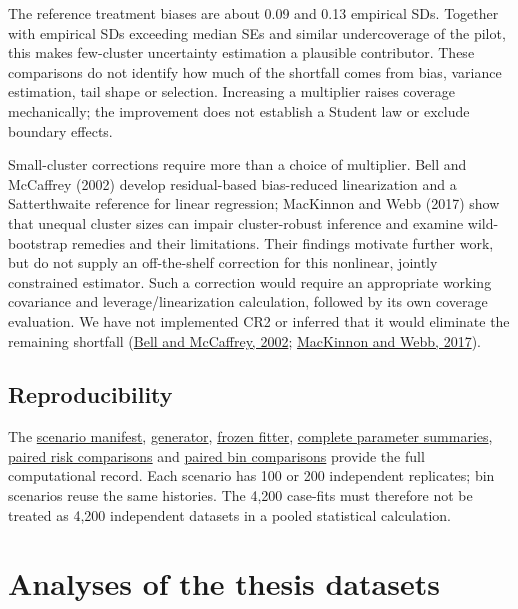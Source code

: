\documentclass[11pt]{article}
\begin{document}
The reference treatment biases are about 0.09 and 0.13 empirical SDs. Together with empirical SDs exceeding median SEs and similar undercoverage of the pilot, this makes few-cluster uncertainty estimation a plausible contributor. These comparisons do not identify how much of the shortfall comes from bias, variance estimation, tail shape or selection. Increasing a multiplier raises coverage mechanically; the improvement does not establish a Student law or exclude boundary effects.

Small-cluster corrections require more than a choice of multiplier. Bell and McCaffrey (2002) develop residual-based bias-reduced linearization and a Satterthwaite reference for linear regression; MacKinnon and Webb (2017) show that unequal cluster sizes can impair cluster-robust inference and examine wild-bootstrap remedies and their limitations. Their findings motivate further work, but do not supply an off-the-shelf correction for this nonlinear, jointly constrained estimator. Such a correction would require an appropriate working covariance and leverage/linearization calculation, followed by its own coverage evaluation. We have not implemented CR2 or inferred that it would eliminate the remaining shortfall (\hyperref[ref:15]{Bell and McCaffrey, 2002}; \hyperref[ref:16]{MacKinnon and Webb, 2017}).

\subsection{Reproducibility}\label{sec:6.9}

The \href{../results/simulations/thesis_boundary_v01/manifest.json}{scenario manifest}, \href{../docs/reproducibility.md}{generator}, \href{../src/frailtyblup/_engine/solver.py}{frozen fitter}, \href{../results/simulations/thesis_boundary_v02/estimates.csv}{complete parameter summaries}, \href{../results/simulations/thesis_boundary_v02/paired_risks.csv}{paired risk comparisons} and \href{../results/simulations/thesis_boundary_v02/paired_bins.csv}{paired bin comparisons} provide the full computational record. Each scenario has 100 or 200 independent replicates; bin scenarios reuse the same histories. The 4,200 case-fits must therefore not be treated as 4,200 independent datasets in a pooled statistical calculation.

\section{Analyses of the thesis datasets}\label{sec:7}
\end{document}
